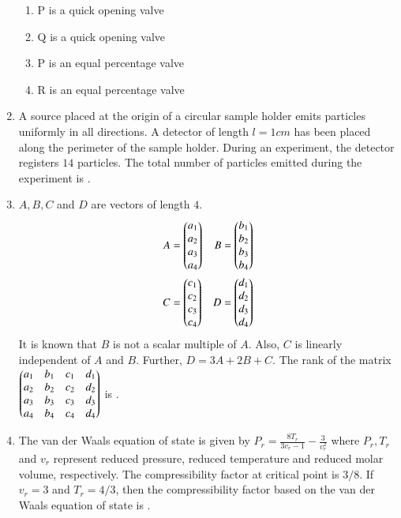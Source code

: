 \documentclass[journal,12pt,onecolumn]{IEEEtran}
\theoremstyle{remark}
\begin{document}
\begin{enumerate}
\hfill{}

\begin{enumerate}
\item P is a quick opening valve
\item Q is a quick opening valve
\item P is an equal percentage valve
\item R is an equal percentage valve
\end{enumerate}

\item A source placed at the origin of a circular sample holder  emits particles uniformly in all directions. A detector of length $l = 1cm$ has been placed along the perimeter of the sample holder. During an experiment, the detector registers $14$ particles. The total number of particles emitted during the experiment is \underline{\hspace{2cm}}.

\hfill{}

\item $A, B, C$ and $D$ are vectors of length $4$.
\begin{align*}
A &= \begin{pmatrix}a_1 \\ a_2 \\ a_3 \\ a_4\end{pmatrix} &
B &= \begin{pmatrix}b_1 \\ b_2 \\ b_3 \\ b_4\end{pmatrix} \\
C &= \begin{pmatrix}c_1 \\ c_2 \\ c_3 \\ c_4\end{pmatrix} &
D &= \begin{pmatrix}d_1 \\ d_2 \\ d_3 \\ d_4\end{pmatrix}
\end{align*}
It is known that $B$ is not a scalar multiple of $A$. Also, $C$ is linearly independent of $A$ and $B$. Further, $D = 3A + 2B + C$. The rank of the matrix $\begin{pmatrix}a_1 & b_1 & c_1 & d_1 \\ a_2 & b_2 & c_2 & d_2 \\ a_3 & b_3 & c_3 & d_3 \\ a_4 & b_4 & c_4 & d_4\end{pmatrix}$ is \underline{\hspace{2cm}}.

\hfill{}

\item The van der Waals equation of state is given by $P_r = \frac{8T_r}{3v_r - 1} - \frac{3}{v_r^2}$ where $P_r, T_r$ and $v_r$ represent reduced pressure, reduced temperature and reduced molar volume, respectively. The compressibility factor at critical point  is $3/8$. If $v_r = 3$ and $T_r = 4/3$, then the compressibility factor based on the van der Waals equation of state is \underline{\hspace{2cm}} .


\end{enumerate}
\end{document}
